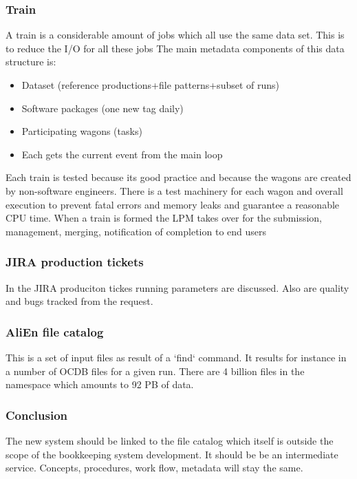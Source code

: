 \subsubsection{Train}
A train is a considerable amount of jobs which all use the same data set. This is to reduce the I/O for all these jobs
The main metadata components of this data structure is:
\begin{itemize}
  \item Dataset (reference productions+file patterns+subset of runs)
  \item Software packages (one new tag daily)
  \item Participating wagons (tasks)
  \item Each gets the current event from the main loop
\end{itemize}
Each train is tested because its good practice and because the wagons are created by non-software engineers. There is a test machinery for each wagon and overall execution to prevent fatal errors and memory leaks and guarantee a reasonable CPU time. When a train is formed the LPM takes over for the submission, management, merging, notification of completion to end users

\subsubsection{JIRA production tickets}
In the JIRA produciton tickes running parameters are discussed. Also are quality and bugs tracked from the request.

\subsubsection{AliEn file catalog}
This is a set of input files as result of a `find` command. It results for instance in a number of OCDB files for a given run. There are 4 billion files in the namespace which amounts to 92 PB of data.

\subsubsection{Conclusion}
The new system should be linked to the file catalog which itself is outside the scope of the bookkeeping system development. It should be be an intermediate service. Concepts, procedures, work flow, metadata will stay the same.
 
